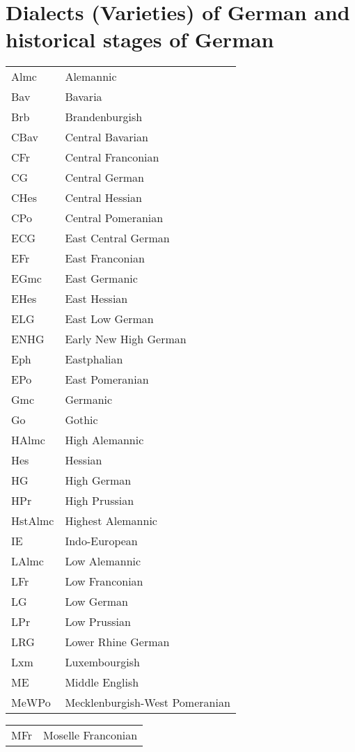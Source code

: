 \addchap{\lsAbbreviationsTitle}


\section*{Dialects (Varieties) of German and historical stages of German}
{\small
\begin{tabularx}{.5\textwidth}[t]{@{}lQ}
Almc & Alemannic\\
Bav & Bavaria\\
Brb & Brandenburgish\\
CBav & Central Bavarian\\
CFr & Central Franconian\\
CG & Central German\\
CHes & Central Hessian\\
CPo & Central Pomeranian\\
ECG & East Central German\\
EFr & East Franconian\\
EGmc & East Germanic\\
EHes & East Hessian\\
ELG & East Low German\\
ENHG & Early New High German\\
Eph & Eastphalian\\
EPo & East Pomeranian\\
Gmc & Germanic\\
Go & Gothic\\
HAlmc & High Alemannic\\
Hes & Hessian\\
HG & High German\\
HPr & High Prussian\\
HstAlmc & Highest Alemannic\\
IE & Indo-European\\
LAlmc & Low Alemannic\\
LFr & Low Franconian\\
LG & Low German\\
LPr & Low Prussian\\
LRG & Lower Rhine German\\
Lxm & Luxembourgish\\
ME & Middle English\\
MeWPo & Mecklenburgish-West Pomeranian\\
\end{tabularx}\begin{tabularx}{.5\textwidth}[t]{lQ@{}}
MFr & Moselle Franconian\\

\end{tabularx}}

